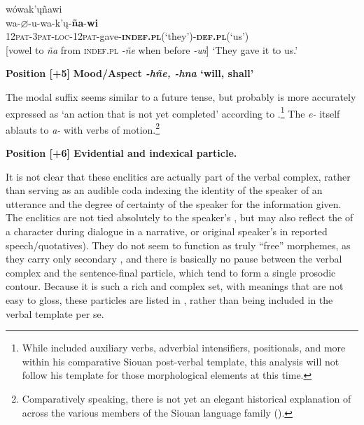\documentclass[output=paper]{LSP/langsci}
\begin{document}
\begin{exe}
\ex \glll  wówak'\k{u}ñawi  \\
wa-\textbf{$\varnothing$}-u-wa-k'\k{u}-\textbf{ña}-\textbf{wi}    \\
\textsc{12pat-3pat-loc-12pat-}gave-\textbf{\textsc{indef.pl}}(`they')-\textbf{\textsc{def.pl}}(`us')  \\     

[vowel  to \textit{ña} from \textsc{indef.pl} \textit{-ñe} when before \textit{-wi}]
\trans `They gave it to us.'  \citep[240]{Whitman1947}
\end{exe} 

\textbf{Position [+5]} \textbf{Mood/Aspect \textit{-hñe, -hna} `will, shall'}

The modal suffix seems similar to a future tense, but probably is more accurately expressed as `an action that is not yet completed' according to \citet{Rankin2009}.\footnote{While \citet{Rankin2009} included auxiliary verbs, adverbial intensifiers, positionals, and more within his comparative Siouan post-verbal template, this analysis will not follow his template for those morphological elements at this time.}   The \textit{e-} itself ablauts to \textit{a-} with verbs of motion.\footnote{Comparatively speaking, there is not yet an elegant historical explanation of  across the various members of the Siouan language family (\citealt[466-468]{Rankin2005b}).}  

\vspace{1em}
\textbf{Position [+6]  Evidential and  indexical particle.}

It is not clear that these enclitics are actually part of the verbal complex, rather than serving as an audible coda indexing the  identity of the speaker of an utterance and the degree of certainty of the speaker for the information given. The enclitics are not tied absolutely to the speaker's , but may also reflect the  of a character during dialogue in a narrative, or original speaker's  in reported speech/quotatives).  They do not seem to function as truly ``free'' morphemes, as they carry only secondary , and there is basically no pause between the verbal complex and the sentence-final particle, which tend to form a single prosodic contour.  Because it is such a rich and complex set, with meanings that are not easy to gloss, these particles are listed in , rather than being included in the verbal template per se.   
\end{document}
